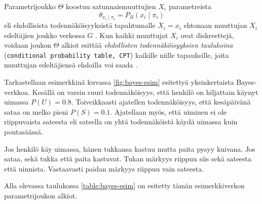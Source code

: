 Parametrijoukko $\Theta$ koostuu satunnaismuuttujien $X_i$ parametreista  
$$ 
    \theta_{x_i \mid \pi_i} = P_B(x_i \mid \pi_i) 
$$  
eli ehdollisista todennäköisyyksistä tapahtumalle $X_i = x_i$ ehtonaan muuttujan $X_i$ edeltäjien joukko verkossa $G$ \citep{ruggeri_bayesian_2008, myllymaki_bayes-verkkojen_1998}. Kun kaikki muuttujat $X_i$ ovat diskreettejä, voidaan joukon $\Theta$ alkiot esittää \emph{ehdollisten todennäköisyyksien taulukoina} (\texttt{conditional probability table, CPT}) kaikille niille tapauksille, joita muuttujan edeltäjiensä ehdoilla voi saada \citep{zhang_brief_2019}. 

Tarkastellaan esimerkkinä kuvassa \ref{fig:bayes-esim} esitettyä yksinkertaista Bayes-verkkoa. Kesällä on varsin suuri todennäköisyys, että henkilö on hiljattain käynyt uimassa $P(U) = 0.8$. Toiveikkaasti ajatellen todennäköisyys, että kesäpäivänä sataa on melko pieni $P(S) = 0.1$. Ajatellaan myös, että uiminen ei ole riippuvaista sateesta eli sateella on yhtä todennäköistä käydä uimassa kuin poutasäässä. 

\begin{center} 
\end{center} 

Jos henkilö käy uimassa, hänen tukkansa kastuu mutta paita pysyy kuivana. Jos sataa, sekä tukka että paita kastuvat. Tukan märkyys riippuu siis sekä sateesta että uinnista. Vastaavasti paidan märkyys riippuu vain sateesta.  

Alla olevassa taulukossa \ref{table:bayes-esim} on esitetty tämän esimerkkiverkon parametrijoukon alkiot. 

